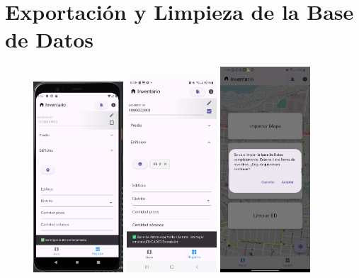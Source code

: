 \section{Exportación y Limpieza de la Base de Datos}
\begin{figure}[h]
    \centering
    \includegraphics[width=0.3\textwidth]{Graphics/Capitulo 4/Pixel 4 [emulador]/4.7/1.png}
    \includegraphics[width=0.3\textwidth]{Graphics/Capitulo 4/Galaxy S23 Ultra Android/4.7/1.jpg}
    \includegraphics[width=0.3\textwidth]{Graphics/Capitulo 4/LG Android 13/4.7/Screenshot_20250615-130550.png}

\end{figure}

